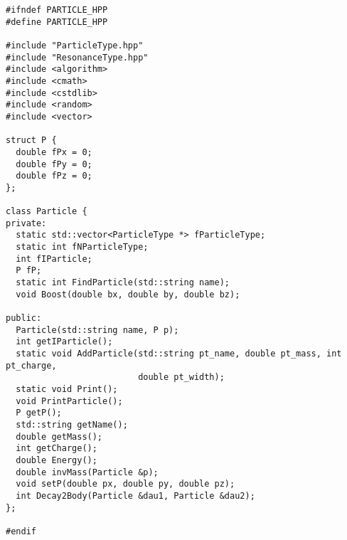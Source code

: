 \begin{lstlisting}
#ifndef PARTICLE_HPP
#define PARTICLE_HPP

#include "ParticleType.hpp"
#include "ResonanceType.hpp"
#include <algorithm>
#include <cmath>
#include <cstdlib>
#include <random>
#include <vector>

struct P {
  double fPx = 0;
  double fPy = 0;
  double fPz = 0;
};

class Particle {
private:
  static std::vector<ParticleType *> fParticleType;
  static int fNParticleType;
  int fIParticle;
  P fP;
  static int FindParticle(std::string name);
  void Boost(double bx, double by, double bz);

public:
  Particle(std::string name, P p);
  int getIParticle();
  static void AddParticle(std::string pt_name, double pt_mass, int pt_charge,
                          double pt_width);
  static void Print();
  void PrintParticle();
  P getP();
  std::string getName();
  double getMass();
  int getCharge();
  double Energy();
  double invMass(Particle &p);
  void setP(double px, double py, double pz);
  int Decay2Body(Particle &dau1, Particle &dau2);
};

#endif
\end{lstlisting}